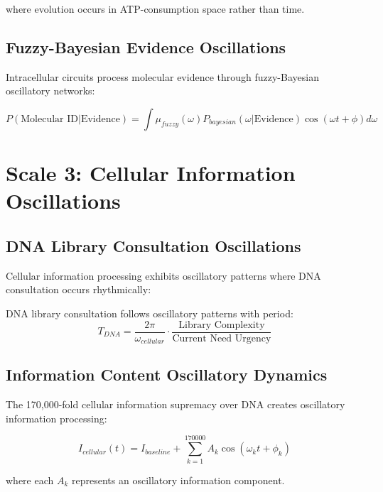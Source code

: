 \documentclass[twocolumn]{article}
\begin{document}
where evolution occurs in ATP-consumption space rather than time.

\subsection{Fuzzy-Bayesian Evidence Oscillations}

Intracellular circuits process molecular evidence through fuzzy-Bayesian oscillatory networks:

\begin{equation}
P(\text{Molecular ID}|\text{Evidence}) = \int \mu_{fuzzy}(\omega) P_{bayesian}(\omega|\text{Evidence}) \cos(\omega t + \phi) d\omega
\end{equation}

\section{Scale 3: Cellular Information Oscillations}

\subsection{DNA Library Consultation Oscillations}

Cellular information processing exhibits oscillatory patterns where DNA consultation occurs rhythmically:

\begin{theorem}
DNA library consultation follows oscillatory patterns with period:
\begin{equation}
T_{DNA} = \frac{2\pi}{\omega_{cellular}} \cdot \frac{\text{Library Complexity}}{\text{Current Need Urgency}}
\end{equation}
\end{theorem}

\subsection{Information Content Oscillatory Dynamics}

The 170,000-fold cellular information supremacy over DNA creates oscillatory information processing:

\begin{equation}
I_{cellular}(t) = I_{baseline} + \sum_{k=1}^{170000} A_k \cos(\omega_k t + \phi_k)
\end{equation}

where each $A_k$ represents an oscillatory information component.
\end{document}

